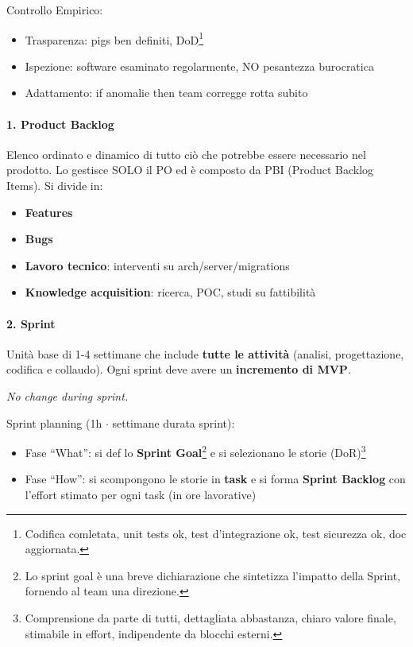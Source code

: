 \documentclass[12pt]{extarticle}
\begin{document}
\noindent Controllo Empirico:
\begin{itemize}
    \item Trasparenza: pigs ben definiti, DoD\footnote{Codifica comletata, unit tests ok, test d'integrazione ok, test sicurezza ok, doc aggiornata.}
    \item Ispezione: software esaminato regolarmente, NO pesantezza burocratica
    \item Adattamento: if anomalie then team corregge rotta subito
\end{itemize}

\paragraph{1. Product Backlog} Elenco ordinato e dinamico di tutto ciò che potrebbe essere necessario nel prodotto. Lo gestisce SOLO il PO ed è composto da PBI (Product Backlog Items). Si divide in:
\begin{itemize}
    \item \textbf{Features}
    \item \textbf{Bugs}
    \item \textbf{Lavoro tecnico}: interventi su arch/server/migrations
    \item \textbf{Knowledge acquisition}: ricerca, POC, studi su fattibilità
\end{itemize}

\paragraph{2. Sprint} Unità base di 1-4 settimane che include \textbf{tutte le attività} (analisi, progettazione, codifica e collaudo). Ogni sprint deve avere un \textbf{incremento di MVP}.\\
\begin{center}
    \textit{No change during sprint.}
\end{center}

\noindent Sprint planning (1h $\cdot$ settimane durata sprint):
\begin{itemize}
    \item Fase ``What'': si def lo \textbf{Sprint Goal}\footnote{Lo sprint goal è una breve dichiarazione che sintetizza l'impatto della Sprint, fornendo al team una direzione.} e si selezionano le storie (DoR)\footnote{Comprensione da parte di tutti, dettagliata abbastanza, chiaro valore finale, stimabile in effort, indipendente da blocchi esterni.}
    \item Fase ``How'': si scompongono le storie in \textbf{task} e si forma \textbf{Sprint Backlog} con l'effort stimato per ogni task (in ore lavorative)
\end{itemize}
\end{document}
